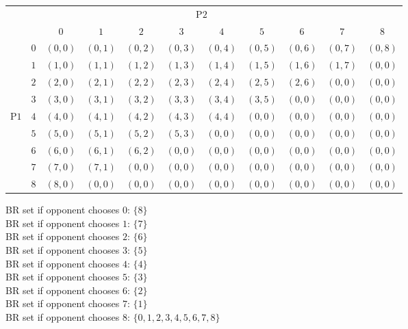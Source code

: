 \documentclass{article}
\begin{document}
\begin{mdframed}[backgroundcolor=blue!20,linecolor=white]
\label{tab:pizza}
\begin{tabular}{cc|c|c|c|c|c|c|c|c|c|}
  & \multicolumn{3}{c}{} & \multicolumn{4}{c}{P$2$} & \multicolumn{3}{c}{} \\
  & \multicolumn{1}{c}{} & \multicolumn{1}{c}{$0$} & \multicolumn{1}{c}{$1$} & \multicolumn{1}{c}{$2$} 
  & \multicolumn{1}{c}{$3$} & \multicolumn{1}{c}{$4$} & \multicolumn{1}{c}{$5$} & \multicolumn{1}{c}{$6$} 
  & \multicolumn{1}{c}{$7$} & \multicolumn{1}{c}{$8$}  \\\cline{3-11}
            & $0$ & $(0,0)$ & $(0,1)$ & $(0,2)$ & $(0,3)$ & $(0,4)$ & $(0,5)$ & $(0,6)$ & $(0,7)$ & $(0,8)$  \\   \cline{3-11}  
            & $1$ & $(1,0)$ & $(1,1)$ & $(1,2)$ & $(1,3)$ & $(1,4)$ & $(1,5)$ & $(1,6)$ & $(1,7)$ & $(0,0)$ \\ \cline{3-11}
  			& $2$ & $(2,0)$ & $(2,1)$ & $(2,2)$ & $(2,3)$ & $(2,4)$ & $(2,5)$ & $(2,6)$ & $(0,0)$ & $(0,0)$\\\cline{3-11}
            & $3$ & $(3,0)$ & $(3,1)$ & $(3,2)$ & $(3,3)$ & $(3,4)$ & $(3,5)$ & $(0,0)$ & $(0,0)$ & $(0,0)$ \\\cline{3-11}
P$1$  & $4$ & $(4,0)$ & $(4,1)$ & $(4,2)$ & $(4,3)$ & $(4,4)$ & $(0,0)$ & $(0,0)$ & $(0,0)$ & $(0,0)$ \\\cline{3-11}
            & $5$ & $(5,0)$ & $(5,1)$ & $(5,2)$ & $(5,3)$ & $(0,0)$ & $(0,0)$ & $(0,0)$ & $(0,0)$ & $(0,0)$ \\\cline{3-11}
            & $6$ & $(6,0)$ & $(6,1)$ & $(6,2)$ & $(0,0)$ & $(0,0)$ & $(0,0)$ & $(0,0)$ & $(0,0)$ & $(0,0)$ \\\cline{3-11}
            & $7$ & $(7,0)$ & $(7,1)$ & $(0,0)$ & $(0,0)$ & $(0,0)$ & $(0,0)$ & $(0,0)$ & $(0,0)$ & $(0,0)$ \\\cline{3-11}
            & $8$ & $(8,0)$ & $(0,0)$ & $(0,0)$ & $(0,0)$ & $(0,0)$ & $(0,0)$ & $(0,0)$ & $(0,0)$ & $(0,0)$ \\\cline{3-11}

\end{tabular}

\end{mdframed}

BR set if opponent chooses $0$: $\{8\}$ \\
BR set if opponent chooses $1$: $\{7\}$ \\
BR set if opponent chooses $2$: $\{6\}$ \\
BR set if opponent chooses $3$: $\{5\}$ \\
BR set if opponent chooses $4$: $\{4\}$ \\
BR set if opponent chooses $5$: $\{3\}$ \\
BR set if opponent chooses $6$: $\{2\}$ \\
BR set if opponent chooses $7$: $\{1\}$ \\
BR set if opponent chooses $8$: $\{0,1,2,3,4,5,6,7,8\}$
\end{document}
